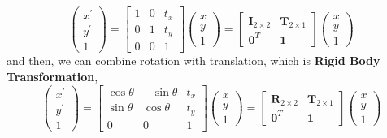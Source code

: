 \documentclass[12pt, a4 paper]{article}
\begin{document}
\begin{equation}
    \begin{pmatrix}
        x^{\prime} \\ y^{\prime} \\ 1
    \end{pmatrix} = 
    \begin{bmatrix}
        1 & 0 & t_{x} \\ 0 & 1 & t_{y} \\ 0 & 0 & 1
    \end{bmatrix} 
    \begin{pmatrix}
        x \\ y \\ 1
    \end{pmatrix} = 
    \begin{bmatrix}
        \boldsymbol{I}_{2 \times 2} & \boldsymbol{T}_{2 \times 1}\\
        \boldsymbol{0}^{T} & \boldsymbol{1}
    \end{bmatrix}
    \begin{pmatrix}
        x \\ y \\ 1
    \end{pmatrix}
\end{equation}
\indent and then, we can combine rotation with translation, which
is \textbf{Rigid Body Transformation},
\begin{equation}
    \begin{pmatrix}
        x^{\prime} \\ y^{\prime} \\ 1
    \end{pmatrix} = 
    \begin{bmatrix}
        \cos\theta & -\sin\theta & t_{x} \\
        \sin\theta & \cos\theta & t_{y} \\
         0 & 0 & 1
    \end{bmatrix} 
    \begin{pmatrix}
        x \\ y \\ 1
    \end{pmatrix} = 
    \begin{bmatrix}
        \boldsymbol{R}_{2 \times 2} & \boldsymbol{T}_{2 \times 1}\\
        \boldsymbol{0}^{T} & \boldsymbol{1}
    \end{bmatrix}
    \begin{pmatrix}
        x \\ y \\ 1
    \end{pmatrix}
\end{equation}
\end{document}
